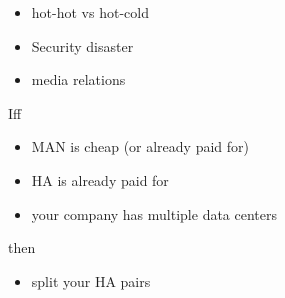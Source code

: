 \documentclass{slides}
\newcommand{\bi}{\begin{itemize}}
\newcommand{\ei}{\end{itemize}}
\begin{document}

\bi
\item hot-hot vs hot-cold
\item Security disaster
\item media relations
\ei


Iff

\bi
\item MAN is cheap (or already paid for)
\item HA is already paid for
\item your company has multiple data centers
\ei

then

\bi
\item split your HA pairs
\ei
\end{document}
